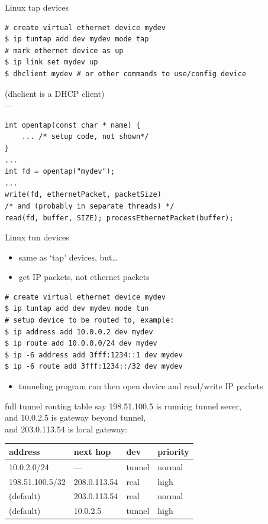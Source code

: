 \begin{frame}[fragile]{Linux tap devices}
\begin{Verbatim}[fontsize=\fontsize{10}{11}]
# create virtual ethernet device mydev
$ ip tuntap add dev mydev mode tap
# mark ethernet device as up
$ ip link set mydev up
$ dhclient mydev # or other commands to use/config device
\end{Verbatim}
(dhclient is a DHCP client) \\
---
\begin{Verbatim}[fontsize=\fontsize{10}{11}]
int opentap(const char * name) {
    ... /* setup code, not shown*/
}
...
int fd = opentap("mydev");
...
write(fd, ethernetPacket, packetSize)
/* and (probably in separate threads) */
read(fd, buffer, SIZE); processEthernetPacket(buffer);
\end{Verbatim}
\end{frame}


\begin{frame}[fragile]{Linux tun devices}
    \begin{itemize}
    \item same as `tap' devices, but\ldots
    \item get IP packets, not ethernet packets
    \end{itemize}
\begin{Verbatim}[fontsize=\fontsize{12}{13}]
# create virtual ethernet device mydev
$ ip tuntap add dev mydev mode tun
# setup device to be routed to, example:
$ ip address add 10.0.0.2 dev mydev
$ ip route add 10.0.0.0/24 dev mydev
$ ip -6 address add 3fff:1234::1 dev mydev
$ ip -6 route add 3fff:1234::/32 dev mydev
\end{Verbatim}
    \begin{itemize}
    \item tunneling program can then open device and read/write IP packets
    \end{itemize}
\end{frame}

\begin{frame}[fragile]{full tunnel routing table}
say 198.51.100.5 is running tunnel sever, \\
and 10.0.2.5  is gateway beyond tunnel, \\
and 203.0.113.54 is local gateway: \\
\begin{tabular}{l|l|l|l}
address & next hop & dev & priority\\ \hline
10.0.2.0/24 & --- & tunnel & normal \\
198.51.100.5/32 & 208.0.113.54 & real & high\\
(default) & 203.0.113.54 & real & normal \\
(default) & 10.0.2.5 & tunnel & high \\
\end{tabular}
\end{frame}

